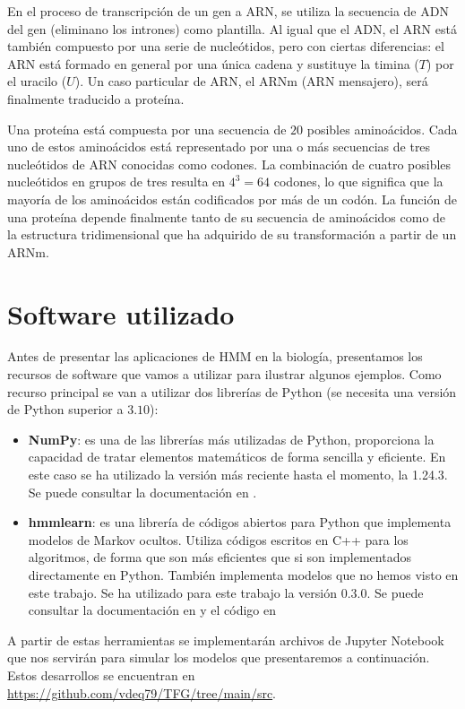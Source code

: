 En el proceso de transcripción de un gen a ARN, se utiliza la secuencia de ADN del gen (eliminano los intrones) como plantilla. Al igual que el ADN, el ARN está también compuesto por una serie de nucleótidos, pero con ciertas diferencias: el ARN está formado en general por una única cadena y sustituye la timina ($T$) por el uracilo ($U$). Un caso particular de ARN, el ARNm (ARN mensajero), será finalmente traducido a proteína.

Una proteína está compuesta por una secuencia de $20$ posibles aminoácidos. Cada uno de estos aminoácidos está representado por una o más secuencias de tres nucleótidos de ARN conocidas como codones. La combinación de cuatro posibles nucleótidos en grupos de tres resulta en $4^3=64$ codones, lo que significa que la mayoría de los aminoácidos están codificados por más de un codón. La función de una proteína depende finalmente tanto de su secuencia de aminoácidos como de la estructura tridimensional que ha adquirido de su transformación a partir de un ARNm. 

\section{Software utilizado}
Antes de presentar las aplicaciones de HMM en la biología, presentamos los recursos de software que vamos a utilizar para ilustrar algunos ejemplos. Como recurso principal se van a utilizar dos librerías de Python (se necesita una versión de Python superior a $3.10$):
\begin{itemize}
    \item \textbf{NumPy}: es una de las librerías más utilizadas de Python, proporciona la capacidad de tratar elementos matemáticos de forma sencilla y eficiente. En este caso se ha utilizado la versión más reciente hasta el momento, la 1.24.3. Se puede consultar la documentación en \cite{numpy}.
    \item \textbf{hmmlearn}: es una librería de códigos abiertos para Python que implementa modelos de Markov ocultos. Utiliza códigos escritos en C++ para los algoritmos, de forma que son más eficientes que si son implementados directamente en Python. También implementa modelos que no hemos visto en este trabajo. Se ha utilizado para este trabajo la versión 0.3.0. Se puede consultar la documentación en \cite{hmmlearn} y el código en \cite{hmmlearnGithub}
\end{itemize}
A partir de estas herramientas se implementarán archivos de Jupyter Notebook que nos servirán para simular los modelos que presentaremos a continuación. Estos desarrollos se encuentran en \url{https://github.com/vdeq79/TFG/tree/main/src}.

